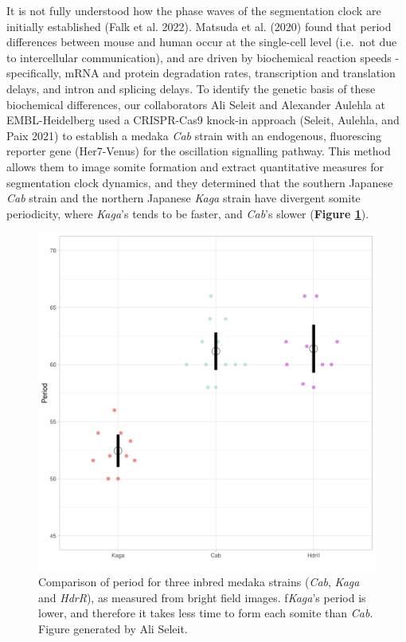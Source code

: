 \documentclass[
]{book}
\begin{document}
It is not fully understood how the phase waves of the segmentation clock are initially established (Falk et al. 2022). Matsuda et al. (2020) found that period differences between mouse and human occur at the single-cell level (i.e.~not due to intercellular communication), and are driven by biochemical reaction speeds - specifically, mRNA and protein degradation rates, transcription and translation delays, and intron and splicing delays. To identify the genetic basis of these biochemical differences, our collaborators Ali Seleit and Alexander Aulehla at EMBL-Heidelberg used a CRISPR-Cas9 knock-in approach (Seleit, Aulehla, and Paix 2021) to establish a medaka \emph{Cab} strain with an endogenous, fluorescing reporter gene (Her7-Venus) for the oscillation signalling pathway. This method allows them to image somite formation and extract quantitative measures for segmentation clock dynamics, and they determined that the southern Japanese \emph{Cab} strain and the northern Japanese \emph{Kaga} strain have divergent somite periodicity, where \emph{Kaga}'s tends to be faster, and \emph{Cab}'s slower (\textbf{Figure \ref{fig:F0-Cab-Kaga-HdrR}}).



\begin{figure}

{\centering \includegraphics[width=0.5\linewidth]{figs/somites/ali_period_F0_Cab_Kaga} 

}

\caption{Comparison of period for three inbred medaka strains (\emph{Cab}, \emph{Kaga} and \emph{HdrR}), as measured from bright field images. f\emph{Kaga}'s period is lower, and therefore it takes less time to form each somite than \emph{Cab}. Figure generated by Ali Seleit.}\label{fig:F0-Cab-Kaga-HdrR}
\end{figure}
\end{document}

